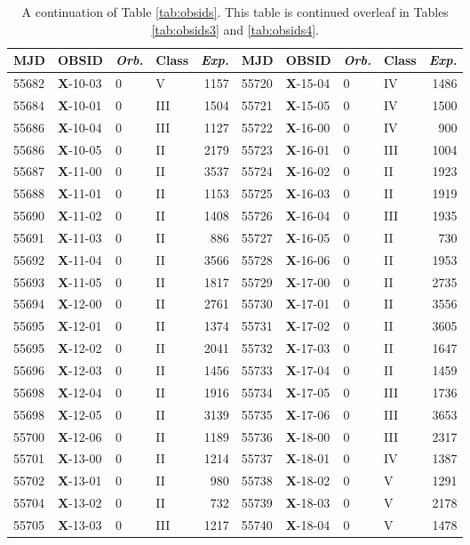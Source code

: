 \begin{table*}
\caption[]{A continuation of Table \ref{tab:obsids}.  This table is continued overleaf in Tables \ref{tab:obsids3} and \ref{tab:obsids4}.}
\label{tab:obsids2}
\begin{tabular}{llllrllllr}
\hline
\hline
MJD&OBSID&\textit{Orb.}&Class&\textit{Exp.}&MJD&OBSID&\textit{Orb.}&Class&\textit{Exp.}\\
\hline
55682&\textbf{X}-10-03&0&V&1157&55720&\textbf{X}-15-04&0&IV&1486\\
55684&\textbf{X}-10-01&0&III&1504&55721&\textbf{X}-15-05&0&IV&1500\\
55686&\textbf{X}-10-04&0&III&1127&55722&\textbf{X}-16-00&0&IV&900\\
55686&\textbf{X}-10-05&0&II&2179&55723&\textbf{X}-16-01&0&III&1004\\
55687&\textbf{X}-11-00&0&II&3537&55724&\textbf{X}-16-02&0&II&1923\\
55688&\textbf{X}-11-01&0&II&1153&55725&\textbf{X}-16-03&0&II&1919\\
55690&\textbf{X}-11-02&0&II&1408&55726&\textbf{X}-16-04&0&III&1935\\
55691&\textbf{X}-11-03&0&II&886&55727&\textbf{X}-16-05&0&II&730\\
55692&\textbf{X}-11-04&0&II&3566&55728&\textbf{X}-16-06&0&II&1953\\
55693&\textbf{X}-11-05&0&II&1817&55729&\textbf{X}-17-00&0&II&2735\\
55694&\textbf{X}-12-00&0&II&2761&55730&\textbf{X}-17-01&0&II&3556\\
55695&\textbf{X}-12-01&0&II&1374&55731&\textbf{X}-17-02&0&II&3605\\
55695&\textbf{X}-12-02&0&II&2041&55732&\textbf{X}-17-03&0&II&1647\\
55696&\textbf{X}-12-03&0&II&1456&55733&\textbf{X}-17-04&0&II&1459\\
55698&\textbf{X}-12-04&0&II&1916&55734&\textbf{X}-17-05&0&III&1736\\
55698&\textbf{X}-12-05&0&II&3139&55735&\textbf{X}-17-06&0&III&3653\\
55700&\textbf{X}-12-06&0&II&1189&55736&\textbf{X}-18-00&0&III&2317\\
55701&\textbf{X}-13-00&0&II&1214&55737&\textbf{X}-18-01&0&IV&1387\\
55702&\textbf{X}-13-01&0&II&980&55738&\textbf{X}-18-02&0&V&1291\\
55704&\textbf{X}-13-02&0&II&732&55739&\textbf{X}-18-03&0&V&2178\\
55705&\textbf{X}-13-03&0&III&1217&55740&\textbf{X}-18-04&0&V&1478\\

\end{tabular}
\end{table*}
